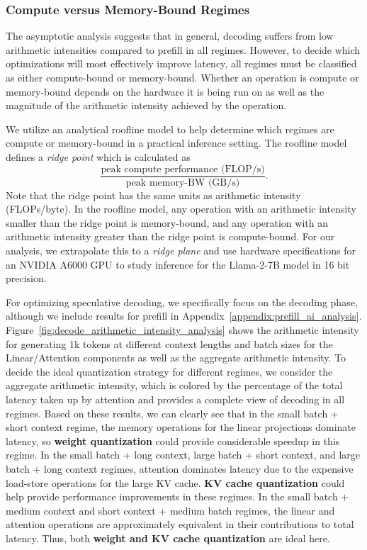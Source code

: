\subsubsection{Compute versus Memory-Bound Regimes}
The asymptotic analysis suggests that in general, decoding suffers from low arithmetic intensities compared to prefill in all regimes. However, to decide which optimizations will most effectively improve latency, all regimes must be classified as either compute-bound or memory-bound. 
Whether an operation is compute or memory-bound depends on the hardware it is being run on as well as the magnitude of the arithmetic intensity achieved by the operation.

We utilize an analytical roofline model \cite{williams2009roofline, kim2023squeezellm, kim2023stackoptimizationtransformerinference} to help determine which regimes are compute or memory-bound in a practical inference setting. The roofline model defines a \textit{ridge point} which is calculated as
\[\frac{\text{peak compute performance (FLOP/s)}}{\text{peak memory-BW (GB/s)}}.\]
Note that the ridge point has the same units as arithmetic intensity (FLOPs/byte). In the roofline model, any operation with an arithmetic intensity smaller than the ridge point 
is memory-bound, and any operation with an arithmetic intensity greater than the ridge point is compute-bound. For our analysis, we extrapolate this to a \textit{ridge plane} and use hardware specifications for an NVIDIA A6000 GPU to study inference for the Llama-2-7B model in 16 bit precision. 

For optimizing speculative decoding, we specifically focus on the decoding phase, although we include results for prefill in Appendix~\ref{appendix:prefill_ai_analysis}. Figure~\ref{fig:decode_arithmetic_intensity_analysis} shows the arithmetic intensity for generating 1k tokens at different context lengths and batch sizes for the Linear/Attention components as well as the aggregate arithmetic intensity.
To decide the ideal quantization strategy for different regimes, we consider the aggregate arithmetic intensity, which is colored by the percentage of the total latency taken up by attention and provides a complete view of decoding in all regimes. 
Based on these results, we can clearly see that in the small batch + short context regime, the memory operations for the linear projections dominate latency, so \textbf{weight quantization} could provide considerable speedup in this regime. In the small batch + long context, large batch + short context, and large batch + long context regimes, attention dominates latency due to the expensive load-store operations for the large KV cache. \textbf{KV cache quantization} could help provide performance improvements in these regimes. In the small batch + medium context and short context + medium batch regimes, the linear and attention operations are approximately equivalent in their contributions to total latency. Thus, both \textbf{weight and KV cache quantization} are ideal here.